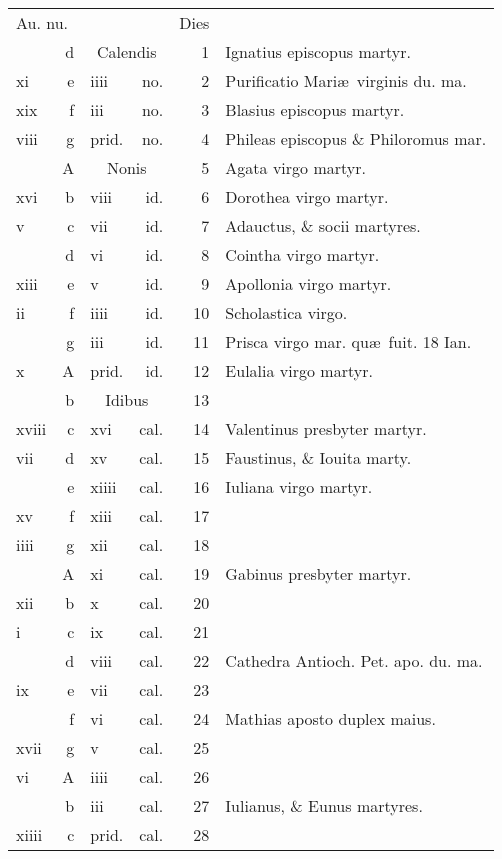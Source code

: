 \documentclass[a5paper,10pt]{book}
\def\ae{æ}
\begin{document}
\begin{center}
\begin{tabular}{l r l r r l}
\multicolumn{2}{l}{\color{red}Au. nu.} & & & \color{red} Dies & \\
 & d & \multicolumn{2}{c}{\color{red} Calendis} & 1 & Ignatius episcopus martyr. \color{black} \\
xi & e & iiii & no. & 2 & \color{red} Purificatio Mari\ae \ virginis du. ma. \color{black} \\
xix & f & iii & no. & 3 & Blasius episcopus martyr. \color{black} \\
viii & g & \color{red} prid. & \color{red} no. & 4 & Phileas episcopus \& Philoromus mar. \color{black} \\
 & \color{red} A & \multicolumn{2}{c}{\color{red} Nonis} & 5 & Agata virgo martyr. \color{black} \\
xvi & b & viii & id. & 6 & Dorothea virgo martyr. \color{black} \\
v & c & vii & id. & 7 & Adauctus, \& socii martyres. \color{black} \\
 & d & vi & id. & 8 & Cointha virgo martyr. \color{black} \\
xiii & e & v & id. & 9 & Apollonia virgo martyr. \color{black} \\
ii & f & iiii & id. & 10 & Scholastica virgo. \\%
 & g & iii & id. & 11 & Prisca virgo mar. \color{red} qu\ae \ fuit. 18 Ian. \color{black} \\%
x & \color{red} A & \color{red} prid. & \color{red} id. & 12 & Eulalia virgo martyr. \color{black} \\
 & b & \multicolumn{2}{c}{\color{red} Idibus} & 13 & \\
xviii & c & xvi & cal. & 14 & Valentinus presbyter martyr. \color{black} \\
vii & d & xv & cal. & 15 & Faustinus, \& Iouita marty. \color{black} \\
 & e & xiiii & cal. & 16 & Iuliana virgo martyr. \color{black} \\
xv & f & xiii & cal. & 17 & \\
iiii & g & xii & cal. & 18 & \\
 & \color{red} A & xi & cal. & 19 & Gabinus presbyter martyr. \color{black} \\
xii & b & x & cal. & 20 & \\
i & c & ix & cal. & 21 & \\
 & d & viii & cal. & 22 & \color{red} Cathedra Antioch. Pet. apo. du. ma. \color{black} \\
ix & e & vii & cal. & 23 & \\
 & f & vi & cal. & 24 & \color{red} Mathias aposto duplex maius. \color{black} \\
xvii & g & v & cal. & 25 & \\
vi & \color{red} A & iiii & cal. & 26 & \\
 & b & iii & cal. & 27 & Iulianus, \& Eunus martyres. \color{black} \\
xiiii & c & \color{red} prid. & \color{red} cal. & 28 & \\
\end{tabular}
\end{center}
\end{document}
